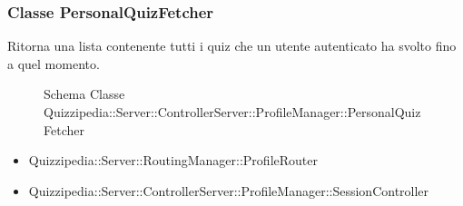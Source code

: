 \subsubsection{Classe PersonalQuizFetcher}
Ritorna una lista contenente tutti i quiz che un utente autenticato ha svolto fino a quel momento.
\begin{figure}[H]
\centering
\noindent{}
\caption{Schema Classe Quizzipedia::Server::ControllerServer::ProfileManager::PersonalQuizFetcher}
\end{figure}
\begin{itemize}
\item Quizzipedia::Server::RoutingManager::ProfileRouter
\end{itemize}
\begin{itemize}
\item Quizzipedia::Server::ControllerServer::ProfileManager::SessionController
\end{itemize}
